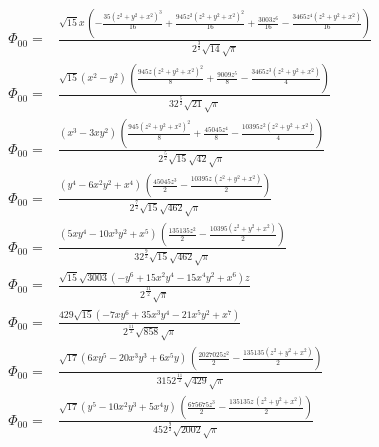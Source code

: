 \documentclass[10pt]{article}
\begin{document}
\begin{align*}
\Phi_{00} = &\frac{\sqrt{15} x\, \left( -\frac{35 {{\left( {{z}^{2}}+{{y}^{2}}+{{x}^{2}}\right) }^{3}}}{16}+\frac{945 {{z}^{2}} {{\left( {{z}^{2}}+{{y}^{2}}+{{x}^{2}}\right) }^{2}}}{16}+\frac{3003 {{z}^{6}}}{16}-\frac{3465 {{z}^{4}} \left( {{z}^{2}}+{{y}^{2}}+{{x}^{2}}\right) }{16}\right) }{{{2}^{\frac{3}{2}}} \sqrt{14} \sqrt{\ensuremath{\pi} }}\\
\Phi_{00} = &\frac{\sqrt{15} \left( {{x}^{2}}-{{y}^{2}}\right) \, \left( \frac{945 z {{\left( {{z}^{2}}+{{y}^{2}}+{{x}^{2}}\right) }^{2}}}{8}+\frac{9009 {{z}^{5}}}{8}-\frac{3465 {{z}^{3}} \left( {{z}^{2}}+{{y}^{2}}+{{x}^{2}}\right) }{4}\right) }{3 {{2}^{\frac{5}{2}}} \sqrt{21} \sqrt{\ensuremath{\pi} }}\\
\Phi_{00} = &\frac{\left( {{x}^{3}}-3 x {{y}^{2}}\right) \, \left( \frac{945 {{\left( {{z}^{2}}+{{y}^{2}}+{{x}^{2}}\right) }^{2}}}{8}+\frac{45045 {{z}^{4}}}{8}-\frac{10395 {{z}^{2}} \left( {{z}^{2}}+{{y}^{2}}+{{x}^{2}}\right) }{4}\right) }{{{2}^{\frac{5}{2}}} \sqrt{15} \sqrt{42} \sqrt{\ensuremath{\pi} }}\\
\Phi_{00} = &\frac{\left( {{y}^{4}}-6 {{x}^{2}} {{y}^{2}}+{{x}^{4}}\right) \, \left( \frac{45045 {{z}^{3}}}{2}-\frac{10395 z\, \left( {{z}^{2}}+{{y}^{2}}+{{x}^{2}}\right) }{2}\right) }{{{2}^{\frac{7}{2}}} \sqrt{15} \sqrt{462} \sqrt{\ensuremath{\pi} }}\\
\Phi_{00} = &\frac{\left( 5 x {{y}^{4}}-10 {{x}^{3}} {{y}^{2}}+{{x}^{5}}\right) \, \left( \frac{135135 {{z}^{2}}}{2}-\frac{10395 \left( {{z}^{2}}+{{y}^{2}}+{{x}^{2}}\right) }{2}\right) }{3 {{2}^{\frac{9}{2}}} \sqrt{15} \sqrt{462} \sqrt{\ensuremath{\pi} }}\\
\Phi_{00} = &\frac{\sqrt{15} \sqrt{3003} \left( -{{y}^{6}}+15 {{x}^{2}} {{y}^{4}}-15 {{x}^{4}} {{y}^{2}}+{{x}^{6}}\right)  z}{{{2}^{\frac{11}{2}}} \sqrt{\ensuremath{\pi} }}\\
\Phi_{00} = &\frac{429 \sqrt{15} \left( -7 x {{y}^{6}}+35 {{x}^{3}} {{y}^{4}}-21 {{x}^{5}} {{y}^{2}}+{{x}^{7}}\right) }{{{2}^{\frac{11}{2}}} \sqrt{858} \sqrt{\ensuremath{\pi} }}\\
%
\Phi_{00} = &\frac{\sqrt{17} \left( 6 x {{y}^{5}}-20 {{x}^{3}} {{y}^{3}}+6 {{x}^{5}} y\right) \, \left( \frac{2027025 {{z}^{2}}}{2}-\frac{135135 \left( {{z}^{2}}+{{y}^{2}}+{{x}^{2}}\right) }{2}\right) }{315 {{2}^{\frac{11}{2}}} \sqrt{429} \sqrt{\ensuremath{\pi} }}\\
\Phi_{00} = &\frac{\sqrt{17} \left( {{y}^{5}}-10 {{x}^{2}} {{y}^{3}}+5 {{x}^{4}} y\right) \, \left( \frac{675675 {{z}^{3}}}{2}-\frac{135135 z\, \left( {{z}^{2}}+{{y}^{2}}+{{x}^{2}}\right) }{2}\right) }{45 {{2}^{\frac{9}{2}}} \sqrt{2002} \sqrt{\ensuremath{\pi} }}\\

\end{align*}
\end{document}
